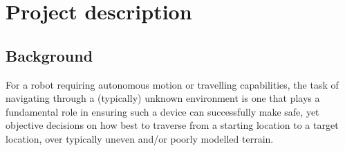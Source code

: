 \documentclass[10pt,fleqn,twoside]{article}
\begin{document}

\mmp

\setcounter{tocdepth}{3} %


\section{Project description}

\subsection{Background}

For a robot requiring autonomous motion or travelling capabilities, the task of navigating through a (typically) unknown environment is one that plays a fundamental role in ensuring such a device can successfully make safe, yet objective decisions on how best to traverse from a starting location to a target location, over typically uneven and/or poorly modelled terrain. \\

\end{document}
